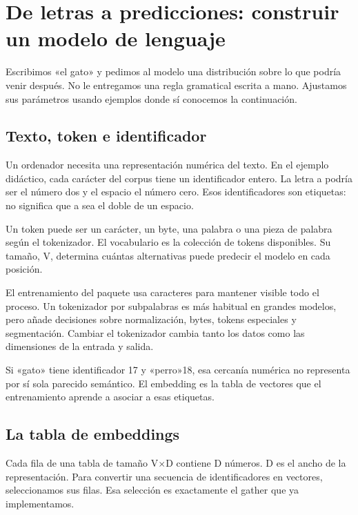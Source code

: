 \documentclass[12pt,a4paper,oneside]{report}
\begin{document}
\chapter{De letras a predicciones: construir un modelo de lenguaje}
\label{ch:lenguaje}
\begin{idea}
Escribimos «el gato» y pedimos al modelo una distribución sobre lo que podría venir después. No le entregamos una regla gramatical escrita a mano. Ajustamos sus parámetros usando ejemplos donde sí conocemos la continuación.

\end{idea}
\section{Texto, token e identificador}
Un ordenador necesita una representación numérica del texto. En el ejemplo didáctico, cada carácter del corpus tiene un identificador entero. La letra a podría ser el número dos y el espacio el número cero. Esos identificadores son etiquetas: no significa que a sea el doble de un espacio.

Un token puede ser un carácter, un byte, una palabra o una pieza de palabra según el tokenizador. El vocabulario es la colección de tokens disponibles. Su tamaño, V, determina cuántas alternativas puede predecir el modelo en cada posición.

El entrenamiento del paquete usa caracteres para mantener visible todo el proceso. Un tokenizador por subpalabras es más habitual en grandes modelos, pero añade decisiones sobre normalización, bytes, tokens especiales y segmentación. Cambiar el tokenizador cambia tanto los datos como las dimensiones de la entrada y salida.

\begin{cuidado}
Si «gato» tiene identificador 17 y «perro»18, esa cercanía numérica no representa por sí sola parecido semántico. El embedding es la tabla de vectores que el entrenamiento aprende a asociar a esas etiquetas.

\end{cuidado}
\section{La tabla de embeddings}
Cada fila de una tabla de tamaño V\ensuremath{\times}D contiene D números. D es el ancho de la representación. Para convertir una secuencia de identificadores en vectores, seleccionamos sus filas. Esa selección es exactamente el gather que ya implementamos.
\end{document}
